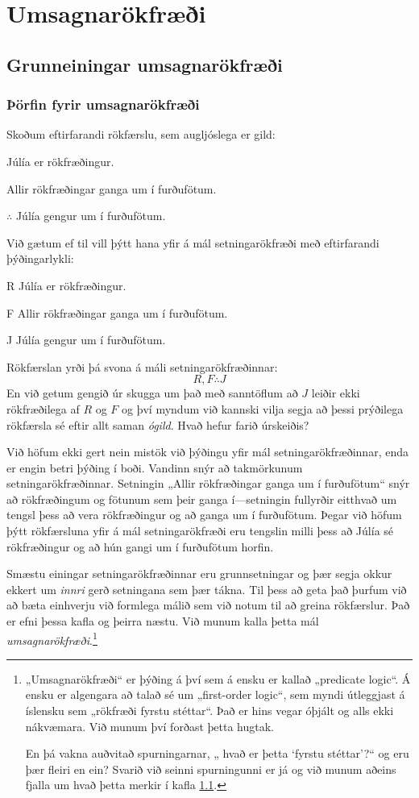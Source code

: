 \part{Umsagnarökfræði}
\label{ch.FOL}

\chapter{Grunneiningar umsagnarökfræði}\label{s:FOLBuildingBlocks}
\section{Þörfin fyrir umsagnarökfræði}
Skoðum eftirfarandi rökfærslu, sem augljóslega er gild:
\begin{earg}
\item[] Júlía er rökfræðingur. 
\item[] Allir rökfræðingar ganga um í furðufötum. 
\item[$\therefore$] Júlía gengur um í furðufötum.
\end{earg}
Við gætum ef til vill þýtt hana yfir á mál setningarökfræði með eftirfarandi þýðingarlykli:
\begin{ekey}
\item[R] Júlía er rökfræðingur.
\item[F] Allir rökfræðingar ganga um í furðufötum.
\item[J] Júlía gengur um í furðufötum.
\end{ekey}
Rökfærslan yrði þá svona á máli setningarökfræðinnar:
$$R, F \therefore J$$
En við getum gengið úr skugga um það með sanntöflum að $J$ leiðir ekki rökfræðilega af $R$ og $F$ og því myndum við kannski vilja segja að þessi prýðilega rökfærsla sé eftir allt saman \emph{ógild}. Hvað hefur farið úrskeiðis?

Við höfum ekki gert nein mistök við þýðingu yfir mál setningarökfræðinnar, enda er engin betri þýðing í boði. Vandinn snýr að takmörkunum setningarökfræðinnar. Setningin „Allir rökfræðingar ganga um í furðufötum“ snýr að rökfræðingum og fötunum sem þeir ganga í---setningin fullyrðir eitthvað um tengsl þess að vera rökfræðingur og að ganga um í furðufötum. Þegar við höfum þýtt rökfærsluna yfir á mál setningarökfræði eru tengslin milli þess að Júlía sé rökfræðingur og að hún gangi um í furðufötum horfin.

Smæstu einingar setningarökfræðinnar eru grunnsetningar og þær segja okkur ekkert um \emph{innri} gerð setningana sem þær tákna. Til þess að geta það þurfum við að bæta einhverju við formlega málið sem við notum til að greina rökfærslur. Það er efni þessa kafla og þeirra næstu. Við munum kalla þetta mál \emph{umsagnarökfræði}.\footnote{„Umsagnarökfræði“ er þýðing á því sem á ensku er kallað „predicate logic“. Á ensku er algengara að talað sé um „first-order logic“, sem myndi útleggjast á íslensku sem „rökfræði fyrstu stéttar“. Það er hins vegar óþjált og alls ekki nákvæmara. Við munum því forðast þetta hugtak. 

En þá vakna auðvitað spurningarnar, „ hvað er þetta `fyrstu stéttar'?“ og eru þær fleiri en ein? Svarið við seinni spurningunni er já og við munum aðeins fjalla um hvað þetta merkir í kafla \ref{}.}

